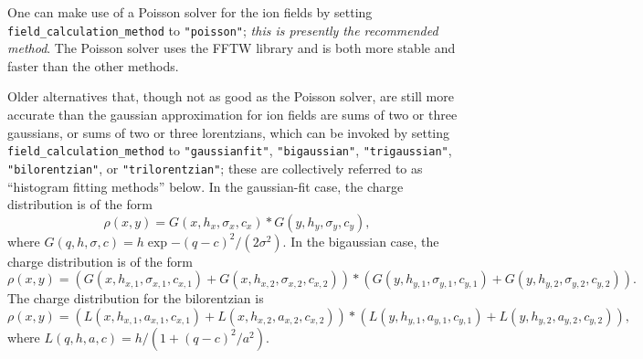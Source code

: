 \documentclass[11pt]{article}
\begin{document}
\begin{itemize}
  One can make use of a Poisson solver for the ion fields by setting \verb|field_calculation_method| to \verb|"poisson"|;
  {\em this is presently the recommended method}. The Poisson solver uses the FFTW library and is both more stable
  and faster than the other methods.

  Older alternatives that, though not as good as the Poisson solver, are still more accurate than the gaussian
  approximation for ion fields are sums of two or three gaussians, or sums of two or three lorentzians, which can be
  invoked by setting \verb|field_calculation_method| to \verb|"gaussianfit"|, \verb|"bigaussian"|, \verb|"trigaussian"|,
  \verb|"bilorentzian"|, or \verb|"trilorentzian"|; these are collectively referred to as ``histogram fitting methods''
  below.  In the gaussian-fit case, the charge distribution is of the form
  \begin{equation}
    \rho(x, y) = G(x, h_x, \sigma_x, c_x)*G(y, h_y, \sigma_y, c_y),
  \end{equation}
  where $G(q, h, \sigma, c) = h\exp{-(q-c)^2/(2\sigma^2)}$.
  In the bigaussian case, the charge distribution is of the form
  \begin{equation}
    \rho(x, y) = (G(x, h_{x,1}, \sigma_{x,1}, c_{x,1}) + G(x, h_{x,2}, \sigma_{x,2}, c_{x,2}))*
    (G(y, h_{y,1}, \sigma_{y,1}, c_{y,1}) + G(y, h_{y,2}, \sigma_{y,2}, c_{y,2})).
  \end{equation}
  The charge distribution for the bilorentzian is
  \begin{equation}
    \rho(x, y) = (L(x, h_{x,1}, a_{x,1}, c_{x,1}) + L(x, h_{x,2}, a_{x,2}, c_{x,2}))*
    (L(y, h_{y,1}, a_{y,1}, c_{y,1}) + L(y, h_{y,2}, a_{y,2}, c_{y,2})),
  \end{equation}
  where $L(q, h, a, c) = h/(1 + (q-c)^2/a^2)$.


\end{itemize}
\end{document}
